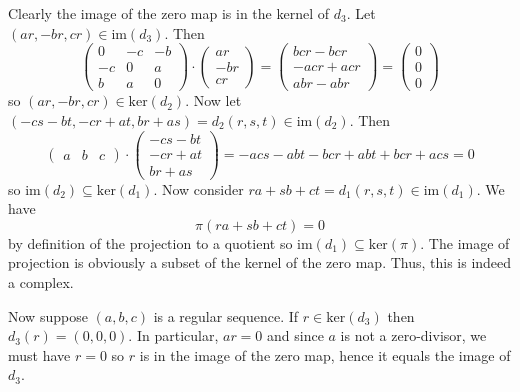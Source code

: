 \documentclass[../../master.tex]{subfiles}
\begin{document}
\begin{solution}
    Clearly the image of the zero map is in the kernel of $d_3$.
    Let $(ar, -br, cr) \in \text{im}(d_3)$.
    Then
    \[
        \begin{pmatrix}
            0 & -c & -b \\
            -c & 0 & a \\
            b & a & 0
        \end{pmatrix} \cdot
        \begin{pmatrix}
            ar \\
            -br \\
            cr
        \end{pmatrix} =
        \begin{pmatrix}
            bcr - bcr \\
            -acr + acr \\
            abr - abr
        \end{pmatrix} =
        \begin{pmatrix}
            0 \\
            0 \\
            0
        \end{pmatrix}
    \]
    so $(ar, -br, cr) \in \text{ker}(d_2)$.
    Now let $(-cs - bt, -cr + at, br + as) = d_2(r, s, t) \in \text{im}(d_2)$.
    Then
    \[
    \begin{pmatrix}
        a & b & c
    \end{pmatrix} \cdot
    \begin{pmatrix}
        -cs -bt \\
        -cr + at \\
        br + as
    \end{pmatrix} =
    -acs - abt - bcr + abt + bcr + acs = 0
    \]
    so $\text{im}(d_2) \subseteq \text{ker}(d_1)$.
    Now consider $ra + sb + ct = d_1(r, s, t) \in \text{im}(d_1)$.
    We have
    \[
        \pi(ra + sb + ct) = 0
    \]
    by definition of the projection to a quotient so $\text{im}(d_1) \subseteq \text{ker}(\pi)$.
    The image of projection is obviously a subset of the kernel of the zero map.
    Thus, this is indeed a complex.

    Now suppose $(a, b, c)$ is a regular sequence.
    If $r \in \text{ker}(d_3)$ then $d_3(r) = (0, 0, 0)$.
    In particular, $ar = 0$ and since $a$ is not a zero-divisor, we must have $r = 0$ so $r$ is in the image of the zero map, hence it equals the image of $d_3$.


\end{solution}
\end{document}
